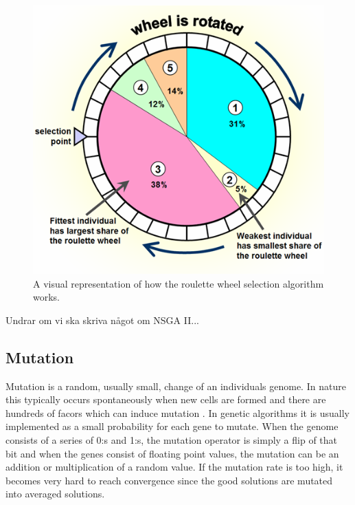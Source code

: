 \documentclass[a4paper,11pt]{kth-mag}
\begin{document}
\begin{figure}
\centering\includegraphics[scale=0.9]{roulettewheel.png}
\caption{A visual representation of how the roulette wheel selection algorithm works.}
\label{roulettewheelpic}
\end{figure}

Undrar om vi ska skriva något om NSGA II...
 
\subsection{Mutation}
Mutation is a random, usually small, change of an individuals genome. In nature this typically occurs spontaneously when new cells are formed and there are hundreds of facors which can induce mutation \cite[p.~46]{vij}. In genetic algorithms it is usually implemented as a small probability for each gene to mutate. When the genome consists of a series of 0:s and 1:s, the mutation operator is simply a flip of that bit and when the genes consist of floating point values, the mutation can be an addition or multiplication of a random value. If the mutation rate is too high, it becomes very hard to reach convergence since the good solutions are mutated into averaged solutions.
\end{document}
